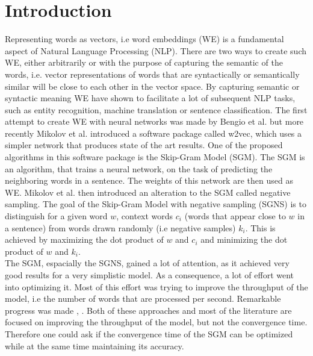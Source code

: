 \section{Introduction}\label{sec:introduction}

Representing words as vectors, i.e word embeddings (WE) is a fundamental aspect of Natural Language Processing (NLP). There are two ways to create such WE, either arbitrarily or with the purpose of capturing the semantic  of the words, i.e. vector representations of words that are syntactically or semantically similar will be close to each other in the vector space. By capturing semantic or syntactic meaning WE have shown to facilitate a lot of subsequent NLP tasks, such as entity recognition, machine translation or sentence classification. 
The first attempt to create WE with neural networks was made by Bengio et al. \citep{bengio} but more recently Mikolov et al. \citep{mikolov} introduced a software package called w2vec, which uses a simpler network that produces state of the art results. One of the proposed algorithms in this software package is the Skip-Gram Model (SGM). The SGM is an algorithm, that trains a neural network, on the task of predicting the neighboring words in a sentence. The weights of this network are then used as WE. Mikolov et al. \citep{mikolov2} then introduced an alteration to the SGM called negative sampling. The goal of the Skip-Gram Model with negative sampling (SGNS) is to distinguish for a given word $w$, context words $c_i$ (words that appear close to $w$ in a sentence) from words drawn randomly (i.e negative samples) $k_i$. This is achieved by maximizing the dot product of $w$ and $c_i$ and minimizing the dot product of $w$ and $k_i$.\\
The SGM, espacially the SGNS, gained a lot of attention, as it achieved very good results for a very simplistic model. As a consequence, a lot of effort went into optimizing it. Most of this effort was trying to improve the throughput of the model, i.e the number of words that are processed per second. Remarkable progress was made \citep{intel} , \citep{gpu}.  Both of these approaches and most of the literature are focused on improving the throughput of the model, but not the convergence time.  Therefore one could ask if the convergence time of the SGM can be optimized while at the same time maintaining its accuracy.\\
